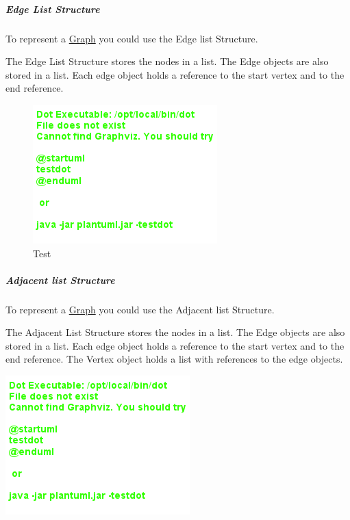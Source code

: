 \documentclass[11pt,twoside,twocolumn,landscape]{article}
\begin{document}
\subparagraph{Edge List Structure}
\label{sec:org4e2ed11}

To represent a \href{../../../roam/20220201163000-graph.org}{Graph} you could use the Edge list Structure.

The Edge List Structure stores the nodes in a list.
The Edge objects are also stored in a list.
Each edge object holds a reference to the start vertex and to the end reference.


\begin{figure}[htbp]
\centering
\includegraphics[width=.9\linewidth]{img/edge_list_structure.png}
\caption{Test}
\end{figure}


\subparagraph{Adjacent list Structure}
\label{sec:org994be00}

To represent a \href{../../../roam/20220201163000-graph.org}{Graph} you could use the Adjacent list Structure.

The Adjacent List Structure stores the nodes in a list.
The Edge objects are also stored in a list.
Each edge object holds a reference to the start vertex and to the end reference.
The Vertex object holds a list with references to the edge objects.


\begin{center}
\includegraphics[width=.9\linewidth]{img/adjacent_list_structure.png}
\end{center}
\end{document}
